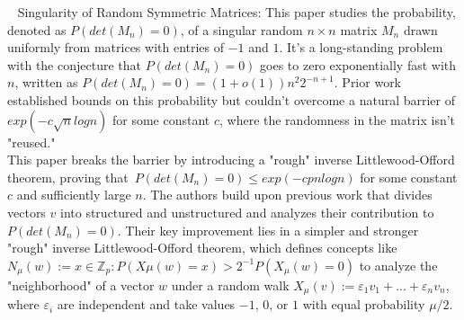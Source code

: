 

\begin{flushleft}
~\cite{campos2022singularity} Singularity of Random Symmetric Matrices: This paper studies the probability, denoted as ${P(det(M_n) = 0)}$, of a singular random ${n \times n}$ matrix ${M_n}$ drawn uniformly from matrices with entries of ${-1}$ and ${1}$. It's a long-standing problem with the conjecture that ${P(det(M_n) = 0)}$ goes to zero exponentially fast with ${n}$, written as ${P(det(M_n) = 0) = (1 + o(1))n^{2}2^{-n+1}}$. Prior work established bounds on this probability but couldn't overcome a natural barrier of ${exp(-c\sqrt{n} log n)}$ for some constant ${c}$, where the randomness in the matrix isn't "reused."\\
This paper breaks the barrier by introducing a "rough" inverse Littlewood-Offord theorem, proving that\ ${P(det(M_n) = 0) \leq exp(-cpn log n)}$ for some constant ${c}$ and sufficiently large ${n}$. The authors build upon previous work that divides vectors ${v}$ into structured and unstructured and analyzes their contribution to ${P(det(M_n) = 0)}$. Their key improvement lies in a simpler and stronger "rough" inverse Littlewood-Offord theorem, which defines concepts like ${N_{\mu}(w) := {x \in \mathbb{Z}_{p} : P(X \mu (w) = x) > 2^{-1}P(X_{\mu}(w) = 0)}}$ to analyze the "neighborhood" of a vector ${w}$ under a random walk ${X_{\mu}(v) := \varepsilon_1 v_1 + ... + \varepsilon_n v_n}$, where ${\varepsilon_i}$ are independent and take values ${-1}$, ${0}$, or ${1}$ with equal probability ${\mu /2}$.
\end{flushleft} 
